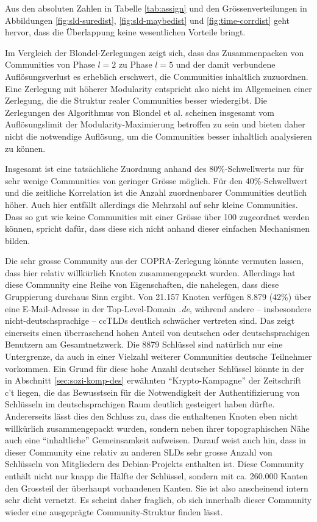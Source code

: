 Aus den absoluten Zahlen in Tabelle \ref{tab:assign} und den
Gr\"ossenverteilungen in Abbildungen \ref{fig:sld-suredist},
\ref{fig:sld-maybedist} und \ref{fig:time-corrdist} geht hervor, dass
die \"Uberlappung keine wesentlichen Vorteile bringt. 

Im Vergleich der Blondel-Zerlegungen zeigt sich, dass das
Zusammenpacken von Communities von Phase $l=2$ zu Phase $l=5$ und der
damit verbundene Aufl\"osungsverlust es erheblich erschwert, die
Communities inhaltlich zuzuordnen. Eine Zerlegung mit h\"oherer
Modularity entspricht also nicht im Allgemeinen einer Zerlegung, die
die Struktur realer Communities besser wiedergibt. Die Zerlegungen des
Algorithmus von Blondel et al. scheinen insgesamt vom
Aufl\"osungslimit der Modularity-Maximierung betroffen zu sein und
bieten daher nicht die notwendige Aufl\"osung, um die Communities
besser inhaltlich analysieren zu k\"onnen.

Insgesamt ist eine tats\"achliche Zuordnung anhand des
80\%-Schwellwerts nur f\"ur sehr wenige Communities von geringer
Gr\"osse m\"oglich. F\"ur den 40\%-Schwellwert und die zeitliche
Korrelation ist die Anzahl zuordnenbarer Communities deutlich
h\"oher. Auch hier entf\"allt allerdings die Mehrzahl auf sehr kleine
Communities.  Dass so gut wie keine Communities mit einer Gr\"osse
\"uber 100 zugeordnet werden k\"onnen, spricht daf\"ur, dass diese
sich nicht anhand dieser einfachen Mechanismen bilden.

Die sehr grosse Community aus der COPRA-Zerlegung k\"onnte vermuten
lassen, dass hier relativ willk\"urlich Knoten zusammengepackt
wurden. Allerdings hat diese Community eine Reihe von Eigenschaften,
die nahelegen, dass diese Gruppierung durchaus Sinn ergibt. Von 21.157
Knoten verf\"ugen 8.879 (42\%) \"uber eine E-Mail-Adresse in der
Top-Level-Domain \emph{.de}, w\"ahrend andere -- insbesondere
nicht-deutschsprachige -- ccTLDs deutlich schw\"acher vertreten
sind. Das zeigt einerseits einen \"uberraschend hohen Anteil von
deutschen oder deutschsprachigen Benutzern am Gesamtnetzwerk. Die 8879
Schl\"ussel sind nat\"urlich nur eine Untergrenze, da auch in einer
Vielzahl weiterer Communities deutsche Teilnehmer vorkommen. Ein Grund
f\"ur diese hohe Anzahl deutscher Schl\"ussel k\"onnte in der in
Abschnitt \ref{sec:sozi-komp-des} erw\"ahnten ``Krypto-Kampagne'' der
Zeitschrift c't liegen, die das Bewusstsein f\"ur die Notwendigkeit
der Authentifizierung von Schl\"usseln im deutschsprachigen Raum
deutlich gesteigert haben d\"urfte. Andererseits l\"asst dies den
Schluss zu, dass die enthaltenen Knoten eben nicht willk\"urlich
zusammengepackt wurden, sondern neben ihrer topographischen N\"ahe
auch eine ``inhaltliche'' Gemeinsamkeit aufweisen. Darauf weist auch
hin, dass in dieser Community eine relativ zu anderen SLDs sehr grosse
Anzahl von Schl\"usseln von Mitgliedern des Debian-Projekts enthalten
ist. Diese Community enth\"alt nicht nur knapp die H\"alfte der
Schl\"ussel, sondern mit ca. 260.000 Kanten den Grossteil der
\"uberhaupt vorhandenen Kanten. Sie ist also anscheinend intern sehr
dicht vernetzt. Es scheint daher fraglich, ob sich innerhalb dieser
Community wieder eine ausgepr\"agte Community-Struktur finden l\"asst.

